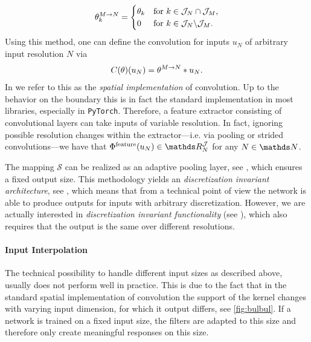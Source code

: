 %
\begin{align*}
\theta^{M \rightarrow N}_k = 
\begin{cases}
\theta_k & \text{for } k \in \mathcal{J}_N \cap \mathcal{J}_M,\\
0 & \text{for } k \in \mathcal{J}_N \backslash \mathcal{J}_M.
\end{cases}
\end{align*}
%
Using this method, one can define the convolution for inputs $u_N$ of arbitrary input resolution $N$ via
%
\begin{align*}
C(\theta)(u_N)= \theta^{M \rightarrow N} \ast u_N.
\end{align*}
%
In \cite{kabri2023resolution} we refer to this as the \emph{spatial implementation} of convolution. Up to the behavior on the boundary this is in fact the standard implementation in most libraries, especially in \texttt{PyTorch}. Therefore, a feature extractor consisting of convolutional layers can take inputs of variable resolution. In fact, ignoring possible resolution changes within the extractor---i.e. via pooling or strided convolutions---we have that $\Phi^{\text{feature}}(\img_N)\in \R^{\mathcal{J}}_N$ for any $N\in\N$.

The mapping $\mathcal{S}$ can be realized as an adaptive pooling layer, see \cite{paszke2019pytorch}, which ensures a fixed output size. This methodology yields an \emph{discretization invariant architecture}, see \cite{kabri2022FNO, kovachki2021universal, li2020fourier}, which means that from a technical point of view the network is able to produce outputs for inputs with arbitrary discretization. However, we are actually interested in \emph{discretization invariant functionality} (see \cite{kabri2022FNO, kovachki2021universal, li2020fourier}), which also requires that the output is the same over different resolutions.
%
\paragraph{Input Interpolation}
%
%
The technical possibility to handle different input sizes as described above, usually does not perform well in practice. This is due to the fact that in the standard spatial implementation of convolution the support of the kernel changes with varying input dimension, for which it output differs, see \cref{fig:bulbul}. If a network is trained on a fixed input size, the filters are adapted to this size and therefore only create meaningful responses on this size.

